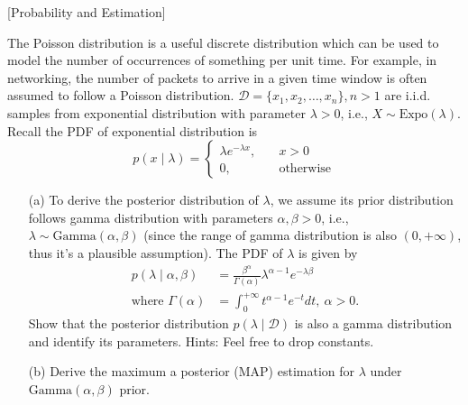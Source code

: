 \item {} [Probability and Estimation]

The Poisson distribution is a useful discrete distribution which can be used to model the number of occurrences of something per unit time. For example, in networking, the number of packets to arrive in a given time window is often assumed to follow a Poisson distribution.
$\mathcal{D}=\{ x_{1}, x_{2}, \ldots, x_{n} \}, n>1$ are i.i.d. samples from exponential distribution with parameter $\lambda > 0$, i.e., $X \sim \text{Expo}(\lambda)$. Recall the PDF of exponential distribution is
$$p(x\mid \lambda) = \begin{cases}
\lambda e^{-\lambda x},&\quad x > 0 \\
0,&\quad \text{otherwise}
\end{cases}$$

\begin{itemize}
\item[(a)] To derive the posterior distribution of $\lambda$, we assume its prior distribution follows gamma distribution with parameters $\alpha,\beta > 0$, i.e., $\lambda \sim\text{Gamma}(\alpha,\beta)$ (since the range of gamma distribution is also $(0,+\infty)$, thus it's a plausible assumption). The PDF of $\lambda$ is given by
\begin{align*}
p(\lambda\mid \alpha,\beta) &= \frac{\beta^{\alpha}}{\Gamma(\alpha)} \lambda^{\alpha-1}e^{-\lambda\beta} \\
\text{where \ \ \ \ } \Gamma(\alpha) &= \int_{0}^{+\infty} t^{\alpha-1}e^{-t}dt,\ \alpha>0.
\end{align*}
Show that the posterior distribution $p(\lambda\mid \mathcal{D})$ is also a gamma distribution and identify its parameters. Hints: Feel free to drop constants. 

\item[(b)] Derive the maximum a posterior (MAP) estimation for $\lambda$ under $\text{Gamma}(\alpha,\beta)$ prior. 

\end{itemize}

\solution

